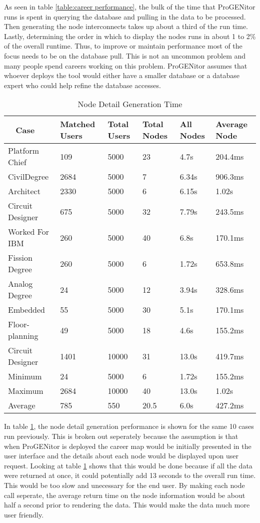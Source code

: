 As seen in table \ref{table:career performance}, the bulk of the time that
ProGENitor runs is spent in querying the database and pulling in the data to be
processed.  Then generating the node interconnects takes up about a third of the
run time. Lastly, determining the order in which to display the nodes runs in
about 1 to 2\% of the overall runtime.  Thus, to improve or maintain performance most of
the focus needs to be on the database pull.  This is not an uncommon problem and
many people spend careers working on this problem.  ProGENitor assumes that
whoever deploys the tool would either have a smaller database or a database
expert who could help refine the database accesses.

\begin{table}[H]
  \centering
  \begin{tabular}{|p{17mm}|p{16mm}|p{10mm}|p{18mm}|p{19mm}|p{20mm}|}
  \hline
  \
  Case&Matched Users&Total Users&Total Nodes&All Nodes&Average Node\\
  \hline\hline
  Platform Chief&109&5000&23&4.7s&204.4ms\\ \hline
  Civil\newline Degree&2684&5000&7&6.34s&906.3ms\\ \hline 
  Architect&2330&5000&6&6.15s&1.02s\\ \hline
  Circuit Designer&675&5000&32&7.79s&243.5ms\\ \hline
  Worked For IBM&260&5000&40&6.8s&170.1ms\\ \hline
  Fission Degree&260&5000&6&1.72s&653.8ms\\ \hline
  Analog Degree&24&5000&12&3.94s&328.6ms\\ \hline
  Embedded&55&5000&30&5.1s&170.1ms\\ \hline
  Floor- \newline planning&49&5000&18&4.6s&155.2ms\\ \hline
  Circuit Designer&1401&10000&31&13.0s&419.7ms\\ \hline
  \hline\hline
  Minimum&24&5000&6&1.72s&155.2ms\\ \hline
  Maximum&2684&10000&40&13.0s&1.02s\\ \hline
  Average&785&550&20.5&6.0s&427.2ms\\ \hline
  \end{tabular}
  \label{table:node-perf}
  \caption{Node Detail Generation Time}
\end{table}

In table \ref{table:node-perf}, the node detail generation performance is shown
for the same 10 cases run previously.  This is broken out seperately because the
assumption is that when ProGENitor is deployed the career map would be initially
presented in the user interface and the details about each node would be
displayed upon user request.  Looking at table \ref{table:node-perf} shows that
this would be done because if all the data were returned at once, it could
potentially add 13 seconds to the overall run time.  This would be too slow and
unecessary for the end user.  By making each node call seperate, the average
return time on the node information would be about half a second prior to
rendering the data.  This would make the data much more user friendly.